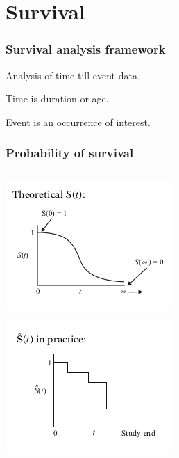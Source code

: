 \documentclass{beamer}
\begin{document}
\section{Survival}

\begin{frame}
  \frametitle{Survival analysis framework}

  \begin{definition}
    Analysis of time till event data. 
    
    Time is duration or age. 
    
    Event is an occurrence of interest.
  \end{definition}

\end{frame}

\begin{frame}
  \frametitle{Probability of survival}

  \begin{columns}
    \begin{column}{0.5\textwidth} 
      \includegraphics[height = 0.4\textheight, width = \textwidth, keepaspectratio = true]{figure/ideal}

      \includegraphics[height = 0.4\textheight, width = \textwidth, keepaspectratio = true]{figure/prac}


\end{column}
\end{columns}
\end{frame}
\end{document}
